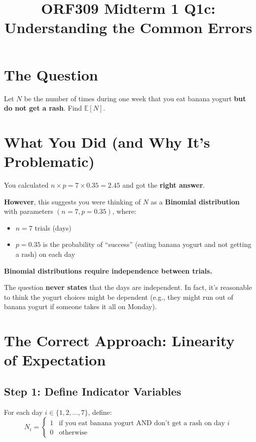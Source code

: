 \documentclass[11pt]{article}
\title{ORF309 Midterm 1 Q1c: Understanding the Common Errors}
\author{}
\date{}
\begin{document}
\maketitle

\section*{The Question}

Let $N$ be the number of times during one week that you eat banana yogurt \textbf{but do not get a rash}. Find $\mathbb{E}[N]$.

\section*{What You Did (and Why It's Problematic)}

You calculated $n \times p = 7 \times 0.35 = 2.45$ and got the \textbf{right answer}.

\textbf{However}, this suggests you were thinking of $N$ as a \textbf{Binomial distribution} with parameters $(n=7, p=0.35)$, where:
\begin{itemize}
    \item $n = 7$ trials (days)
    \item $p = 0.35$ is the probability of ``success'' (eating banana yogurt and not getting a rash) on each day
\end{itemize}

\begin{tcolorbox}[colback=red!10, colframe=red!50!black, title=The Problem]
\textbf{Binomial distributions require independence between trials.}

The question \textbf{never states} that the days are independent. In fact, it's reasonable to think the yogurt choices might be dependent (e.g., they might run out of banana yogurt if someone takes it all on Monday).
\end{tcolorbox}

\section*{The Correct Approach: Linearity of Expectation}

\subsection*{Step 1: Define Indicator Variables}

For each day $i \in \{1, 2, \ldots, 7\}$, define:
\[
N_i = \begin{cases}
1 & \text{if you eat banana yogurt AND don't get a rash on day } i \\
0 & \text{otherwise}
\end{cases}
\]
\end{document}
